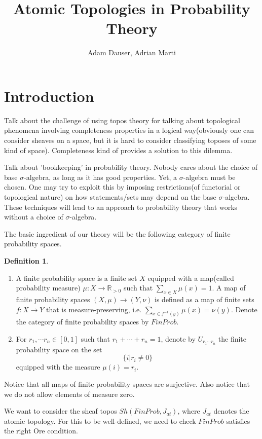 \documentclass[a4paper]{amsproc}
\title{\textbf{Atomic Topologies in Probability Theory}}
\author{Adam Dauser, Adrian Marti}
\date{}
\theoremstyle{plain}
\theoremstyle{definition}
\newtheorem{definition}{Definition}[section]
\theoremstyle{remark}
\numberwithin{equation}{section}
\begin{document}
\maketitle 
\section{Introduction}

Talk about the challenge of using topos theory for talking about topological phenomena involving completeness properties in a logical way(obviously one can consider sheaves on a space, but it is hard to consider classifying toposes of some kind of space). Completeness kind of provides a solution to this dilemma.

Talk about 'bookkeeping' in probability theory. Nobody cares about the choice of base $\sigma$-algebra, as long as it has good properties. Yet, a $\sigma$-algebra must be chosen. One may try to exploit this by imposing restrictions(of functorial or topological nature) on how statements/sets may depend on the base $\sigma$-algebra. These techniques will lead to an approach to probability theory that works without a choice of $\sigma$-algebra.

The basic ingredient of our theory will be the following category of finite probability spaces.

\begin{definition}
\begin{enumerate}
\item A finite probability space is a finite set $X$ equipped with a map(called probability measure) $\mu: X \to \mathbb{R}_{>0}$ such that $\sum_{x \in X} \mu(x) = 1$. A map of finite probability spaces $(X,\mu) \to (Y,\nu)$ is defined as a map of finite sets $f: X \to Y$ that is measure-preserving, i.e. $\sum_{x \in f^{-1}(y)} \mu(x) = \nu(y)$. Denote the category of finite probability spaces by $FinProb$.
\item For $r_1, \cdots r_n \in [0,1]$ such that $r_1 + \cdots + r_n = 1$, denote by $U_{r_1 \cdots r_n}$ the finite probability space on the set 
\[
    \{i | r_i \neq 0 \}
\]
equipped with the measure $\mu(i) = r_i$.
\end{enumerate}
\end{definition}

Notice that all maps of finite probability spaces are surjective. Also notice that we do not allow elements of measure zero.

We want to consider the sheaf topos $Sh(FinProb, J_{at})$, where $J_{at}$ denotes the atomic topology. For this to be well-defined, we need to check $FinProb$ satisfies the right Ore condition.
\end{document}
